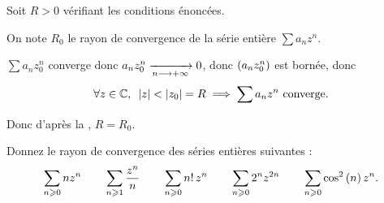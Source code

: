 \begin{dem}
Soit \(R>0\) vérifiant les conditions énoncées.

On note \(R_0\) le rayon de convergence de la série entière \(\sum a_nz^n\).

\(\sum a_nz_0^n\) converge donc \(a_nz_0^n\xrightarrow[n\longrightarrow+\infty]{}0\), donc \(\left(a_nz_0^n\right)\) est bornée, donc \[\quantifs{\forall z\in\C}\abs{z}<\abs{z_0}=R\imp\sum a_nz^n\text{ converge}.\]

Donc d'après la , \(R=R_0\).
\end{dem}

\begin{exo}
Donnez le rayon de convergence des séries entières suivantes : \[\sum_{n\geqslant0}nz^n\qquad\sum_{n\geqslant1}\dfrac{z^n}{n}\qquad\sum_{n\geqslant0}n!\,z^n\qquad\sum_{n\geqslant0}2^nz^{2n}\qquad\sum_{n\geqslant0}\cos^2\left(n\right)z^n.\]
\end{exo}

